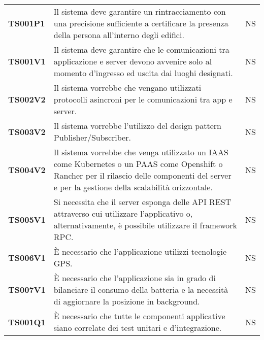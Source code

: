 \documentclass[../piano-di-qualifica.tex]{subfiles}
\begin{document}
\begin{centering}
\begin{longtable}[H]{>{\centering\bfseries}m{3cm} >{}p{10cm} >{\centering\arraybackslash}m{3cm}}

        TS001P1 & Il sistema deve garantire un rintracciamento con una precisione sufficiente a certificare la presenza della persona all’interno degli edifici. \newline
                & NS \\

        TS001V1 & Il sistema deve garantire che le comunicazioni tra applicazione e server devono avvenire solo al momento d’ingresso ed uscita dai luoghi designati. \newline
                & NS \\

        TS002V2 & Il sistema vorrebbe che vengano utilizzati protocolli asincroni per le comunicazioni tra app e server. \newline
                & NS \\

        TS003V2 & Il sistema vorrebbe l’utilizzo del design pattern Publisher/Subscriber. \newline
                & NS \\

        TS004V2 & Il sistema vorrebbe che venga utilizzato un IAAS come Kubernetes o un PAAS come Openshift o Rancher per il rilascio delle componenti del server e per la gestione della scalabilità orizzontale. \newline
                & NS \\

        TS005V1 & Si necessita che il server esponga delle API REST attraverso cui utilizzare l’applicativo o, alternativamente, è possibile utilizzare il framework RPC\@. \newline
                & NS \\

        TS006V1 & È necessario che l’applicazione utilizzi tecnologie GPS\@. \newline
                & NS \\

        TS007V1 & È necessario che l’applicazione sia in grado di bilanciare il consumo della batteria e la necessità di aggiornare la posizione in background. \newline
                & NS \\

        TS001Q1 & È necessario che tutte le componenti applicative siano correlate dei test unitari e d’integrazione. \newline
                & NS \\


\end{longtable}
\end{centering}
\end{document}
